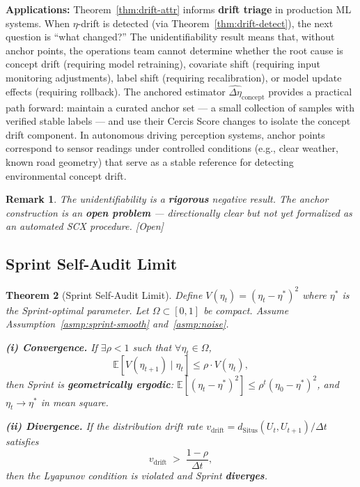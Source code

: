 \documentclass[12pt,a4paper]{article}
\newtheorem{theorem}{Theorem}[section]
\newtheorem{remark}[theorem]{Remark}
\newcommand{\openquest}{\textcolor{red!70!black}{\small\textsf{[Open]}}}
\newcommand{\E}{\mathbb{E}}
\newcommand{\Situs}{\mathrm{Situs}}
\begin{document}
\medskip\noindent
\textbf{Applications:}
Theorem~\ref{thm:drift-attr} informs \textbf{drift triage} in production ML
systems.  When $\eta$-drift is detected (via Theorem~\ref{thm:drift-detect}),
the next question is ``what changed?'' The unidentifiability result means that,
without anchor points, the operations team cannot determine whether the root
cause is concept drift (requiring model retraining), covariate shift (requiring
input monitoring adjustments), label shift (requiring recalibration), or model
update effects (requiring rollback).  The anchored estimator
$\widehat{\Delta\eta}_{\mathrm{concept}}$ provides a practical path forward:
maintain a curated anchor set --- a small collection of samples with verified
stable labels --- and use their Cercis Score changes to isolate the concept
drift component.  In autonomous driving perception systems, anchor points
correspond to sensor readings under controlled conditions (e.g., clear
weather, known road geometry) that serve as a stable reference for detecting
environmental concept drift.

\begin{remark}
The unidentifiability is a \textbf{rigorous} negative result.  The anchor
construction is an \textbf{open problem} --- directionally clear but not yet
formalized as an automated SCX procedure.  \openquest
\end{remark}

\subsection{Sprint Self-Audit Limit}
\label{sec:sprint-limit}

\begin{theorem}[Sprint Self-Audit Limit]
\label{thm:sprint-limit}
Define $V(\eta_t) = (\eta_t - \eta^*)^2$ where $\eta^*$ is the
Sprint-optimal parameter.  Let $\Omega \subset [0,1]$ be compact.
Assume Assumption~\ref{asmp:sprint-smooth} and~\ref{asmp:noise}.

\textbf{(i) Convergence.}  If $\exists \rho < 1$ such that
$\forall \eta_t \in \Omega$,
\begin{equation}\label{eq:lyapunov-condition}
    \E[V(\eta_{t+1}) \mid \eta_t] \leq \rho \cdot V(\eta_t),
\end{equation}
then Sprint is \textbf{geometrically ergodic}:
$\E[(\eta_t - \eta^*)^2] \leq \rho^t (\eta_0 - \eta^*)^2$, and
$\eta_t \to \eta^*$ in mean square.

\textbf{(ii) Divergence.}  If the distribution drift rate
$v_{\mathrm{drift}} = d_{\Situs}(U_t, U_{t+1}) / \Delta t$ satisfies
\begin{equation}\label{eq:divergence-condition}
    v_{\mathrm{drift}} \;>\; \frac{1 - \rho}{\Delta t},
\end{equation}
then the Lyapunov condition is violated and Sprint \textbf{diverges}.
\end{theorem}
\end{document}
